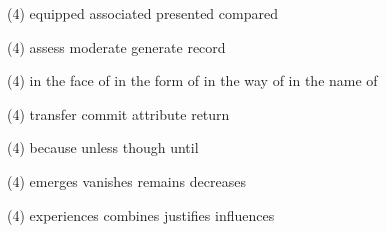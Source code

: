 \item
\begin{tasks}(4)
	\task equipped
	\task associated
	\task presented
	\task compared
\end{tasks}
\item
\begin{tasks}(4)
	\task assess
	\task moderate
	\task generate
	\task record
\end{tasks}
\item
\begin{tasks}(4)
	\task in the face of
	\task in the form of
	\task in the way of
	\task in the name of
\end{tasks}
\item
\begin{tasks}(4)
	\task transfer
	\task commit
	\task attribute
	\task return
\end{tasks}
\item
\begin{tasks}(4)
	\task because
	\task unless
	\task though
	\task until
\end{tasks}
\item
\begin{tasks}(4)
	\task emerges
	\task vanishes
	\task remains
	\task decreases
\end{tasks}
\item
\begin{tasks}(4)
	\task experiences
	\task combines
	\task justifies
	\task influences
\end{tasks}